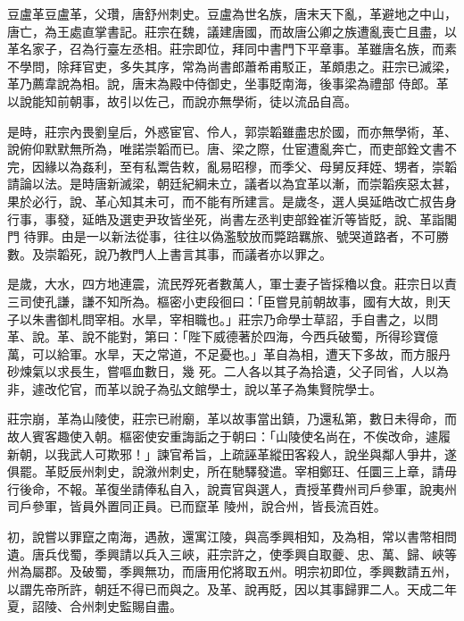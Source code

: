 
\begin{pinyinscope}

 豆盧革豆盧革，父瓚，唐舒州刺史。豆盧為世名族，唐末天下亂，革避地之中山，唐亡，為王處直掌書記。莊宗在魏，議建唐國，而故唐公卿之族遭亂喪亡且盡，以革名家子，召為行臺左丞相。莊宗即位，拜同中書門下平章事。革雖唐名族，而素不學問，除拜官吏，多失其序，常為尚書郎蕭希甫駁正，革頗患之。莊宗已滅梁，革乃薦韋說為相。說，唐末為殿中侍御史，坐事貶南海，後事梁為禮部
 侍郎。革以說能知前朝事，故引以佐己，而說亦無學術，徒以流品自高。



 是時，莊宗內畏劉皇后，外惑宦官、伶人，郭崇韜雖盡忠於國，而亦無學術，革、說俯仰默默無所為，唯諾崇韜而已。唐、梁之際，仕宦遭亂奔亡，而吏部銓文書不完，因緣以為姦利，至有私鬻告敕，亂易昭穆，而季父、母舅反拜姪、甥者，崇韜請論以法。是時唐新滅梁，朝廷紀綱未立，議者以為宜革以漸，而崇韜疾惡太甚，果於必行，說、革心知其未可，而不能有所建言。是歲冬，選人吳延皓改亡叔告身行事，事發，延皓及選吏尹玫皆坐死，尚書左丞判吏部銓崔沂等皆貶，說、革詣閣門
 待罪。由是一以新法從事，往往以偽濫駮放而斃踣羈旅、號哭道路者，不可勝數。及崇韜死，說乃教門人上書言其事，而議者亦以罪之。



 是歲，大水，四方地連震，流民殍死者數萬人，軍士妻子皆採穭以食。莊宗日以責三司使孔謙，謙不知所為。樞密小吏段徊曰：「臣嘗見前朝故事，國有大故，則天子以朱書御札問宰相。水旱，宰相職也。」莊宗乃命學士草詔，手自書之，以問革、說。革、說不能對，第曰：「陛下威德著於四海，今西兵破蜀，所得珍寶億萬，可以給軍。水旱，天之常道，不足憂也。」革自為相，遭天下多故，而方服丹砂煉氣以求長生，嘗嘔血數日，幾
 死。二人各以其子為拾遺，父子同省，人以為非，遽改佗官，而革以說子為弘文館學士，說以革子為集賢院學士。



 莊宗崩，革為山陵使，莊宗已祔廟，革以故事當出鎮，乃還私第，數日未得命，而故人賓客趣使入朝。樞密使安重誨詬之于朝曰：「山陵使名尚在，不俟改命，遽履新朝，以我武人可欺邪！」諫官希旨，上疏誣革縱田客殺人，說坐與鄰人爭井，遂俱罷。革貶辰州刺史，說漵州刺史，所在馳驛發遣。宰相鄭玨、任圜三上章，請毋行後命，不報。革復坐請俸私自入，說賣官與選人，責授革費州司戶參軍，說夷州司戶參軍，皆員外置同正員。已而竄革
 陵州，說合州，皆長流百姓。



 初，說嘗以罪竄之南海，遇赦，還寓江陵，與高季興相知，及為相，常以書幣相問遺。唐兵伐蜀，季興請以兵入三峽，莊宗許之，使季興自取夔、忠、萬、歸、峽等州為屬郡。及破蜀，季興無功，而唐用佗將取五州。明宗初即位，季興數請五州，以謂先帝所許，朝廷不得已而與之。及革、說再貶，因以其事歸罪二人。天成二年夏，詔陵、合州刺史監賜自盡。




\end{pinyinscope}
